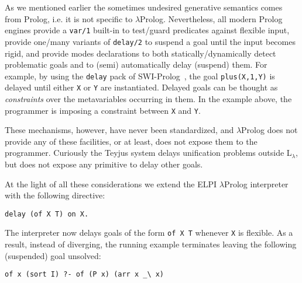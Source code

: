 \documentclass{easychair}
\begin{document}
As we mentioned earlier the sometimes undesired generative semantics
comes from Prolog, i.e. it is not specific to $\lambda$Prolog.
Nevertheless, all modern Prolog engines provide a \verb+var/1+
built-in to test/guard predicates against flexible input, provide
one/many variants of \verb+delay/2+ to suspend a goal until the input
becomes rigid, and provide modes declarations to both
statically/dynamically detect problematic goals and to (semi)
automatically delay (suspend) them.
For example, by using the \verb+delay+ pack of SWI-Prolog~\cite{SWI}, the goal
\verb+plus(X,1,Y)+ is delayed until either \verb+X+ or \verb+Y+ are
instantiated.  Delayed goals can be thought as \emph{constraints} over the
metavariables occurring in them. In the example above, the programmer is
imposing a constraint between \verb+X+ and \verb+Y+.

These mechanisms, however, have never been standardized, and
$\lambda$Prolog does not provide any of these facilities, or at least,
does not expose them to the programmer.  Curiously the Teyjus system
delays unification problems outside L$_\lambda$, but does not expose
any primitive to delay other goals.

At the light of all these considerations we extend the ELPI
$\lambda$Prolog interpreter with the following directive:

\begin{Verbatim}
delay (of X T) on X.
\end{Verbatim}

The interpreter now delays goals of the form \verb+of X T+ whenever \verb+X+
is flexible.  As a result, instead of diverging, the running example
terminates leaving the following (suspended) goal unsolved:

\begin{Verbatim}
of x (sort I) ?- of (P x) (arr x _\ x)
\end{Verbatim}
\end{document}
